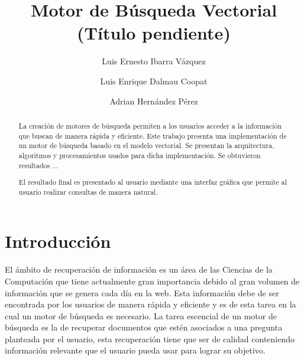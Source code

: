 \documentclass[runningheads]{llncs}
\begin{document}
%
\title{Motor de Búsqueda Vectorial (Título pendiente)}
%
%
\author{Luis Ernesto Ibarra Vázquez \and
Luis Enrique Dalmau Coopat \and
Adrian Hernández Pérez}
%
%
%
\maketitle              %
%
\begin{abstract}
La creación de motores de búsqueda permiten a los usuarios acceder a la información
que buscan de manera rápida y eficiente. Este trabajo presenta una implementación de 
un motor de búsqueda basado en el modelo vectorial. Se presentan la arquitectura,
algoritmos y procesamientos usados para dicha implementación. Se obtuvieron resultados ...

El resultado final es presentado al usuario mediante una interfaz gráfica que permite
al usuario realizar consultas de manera natural.

\end{abstract}

\section{Introducción}

El ámbito de recuperación de información es un área de las Ciencias de la Computación que tiene
actualmente gran importancia debido al gran volumen de información que se genera cada día en la
web. Esta información debe de ser encontrada por los usuarios de manera rápida y eficiente y es
de esta tarea en la cual un motor de búsqueda es necesario. La tarea escencial de un motor de
búsqueda es la de recuperar documentos que estén asociados a una pregunta planteada por el usuario, 
esta recuperación tiene que ser de calidad conteniendo información relevante que el usuario pueda
usar para lograr su objetivo.
\end{document}
